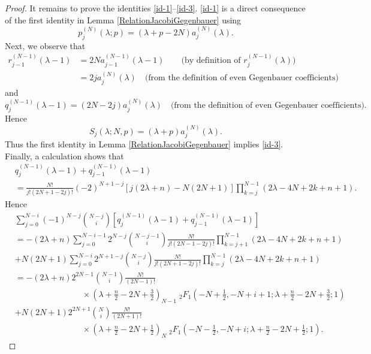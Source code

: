 \documentclass[a4paper,12pt,reqno]{amsart}
\numberwithin{theorem}{subsection}
\numberwithin{equation}{section}
\begin{document}
\begin{proof}
It remains to prove the identities \eqref{id-1}--\eqref{id-3}. \eqref{id-1} is
a direct consequence of the first identity in Lemma
\ref{RelationJacobiGegenbauer} using
$$
   p^{(N)}_j(\lambda;p) = (\lambda\!+\!p\!-\!2N) a_j^{(N)}(\lambda).
$$
Next, we observe that
\begin{align*}
   r_{j-1}^{(N-1)}(\lambda\!-\!1) & = 2N a_{j-1}^{(N-1)}(\lambda\!-\!1) \qquad
   \mbox{(by definition of $r_j^{(N-1)}(\lambda)$)} \\
   & = 2j a_j^{(N)}(\lambda) \quad \mbox{(from the definition of even Gegenbauer coefficients)}
\end{align*}
and
$$
   q_j^{(N-1)}(\lambda\!-\!1) = (2N\!-\!2j) a_j^{(N)}(\lambda)
   \quad \mbox{(from the definition of even Gegenbauer coefficients)}.
$$
Hence
$$
   S_j(\lambda;N,p) = (\lambda\!+\!p) a_j^{(N)}(\lambda).
$$
Thus the first identity in Lemma \ref{RelationJacobiGegenbauer} implies
\eqref{id-3}. Finally, a calculation shows that
\begin{align*}
   & q_{j}^{(N-1)}(\lambda\!-\!1) + q_{j-1}^{(N-1)}(\lambda\!-\!1) \\
   & = \frac{N!}{j!(2N\!+\!1\!-\!2j)!} (-2)^{N+1-j} \left[j(2\lambda\!+\!n) -
   N(2N\!+\!1)\right] \prod_{k=j}^{N-1} (2\lambda\!-\!4N\!+\!2k\!+\!n\!+\!1).
\end{align*}
Hence
\begin{align*}
   & \sum_{j=0}^{N-i} (-1)^{N-j} \binom{N-j}{i} \left[q_{j}^{(N-1)}(\lambda\!-\!1)
   + q_{j-1}^{(N-1)}(\lambda\!-\!1)\right] \\
   & = -(2\lambda\!+\!n) \sum_{j=0}^{N-i-1} 2^{N-j} \binom{N-j-1}{i}
   \frac{N!}{j!(2N\!-\!1\!-\!2j)!} \prod_{k=j+1}^{N-1} (2\lambda\!-\!4N\!+\!2k\!+\!n\!+\!1) \\
   & + N(2N\!+\!1) \sum_{j=0}^{N-i} 2^{N+1-j} \binom{N-j}{i} \frac{N!}{j!(2N\!+\!1\!-\!2j)!}
   \prod_{k=j}^{N-1} (2\lambda\!-\!4N\!+\!2k\!+\!n\!+\!1) \\
   & = -(2\lambda\!+\!n) 2^{2N-1} \binom{N-1}{i} \frac{N!}{(2N\!-\!1)!} \\
   & \qquad \qquad \qquad \qquad \times
   (\lambda\!+\!\tfrac{n}{2}\!-\!2N\!+\!\tfrac{3}{2})_{N-1} \;
   {}_2F_1(-N\!+\!\tfrac{1}{2},-N\!+\!i\!+\!1;\lambda\!+\!\tfrac{n}{2}\!-\!2N\!+\!\tfrac{3}{2};1) \\
   & + N(2N\!+\!1) 2^{2N+1} \binom{N}{i} \frac{N!}{(2N\!+\!1)!} \\
   & \qquad \qquad \qquad \qquad \times (\lambda\!+\!\tfrac{n}{2}\!-\!2N\!+\!\tfrac{1}{2})_N
   \; {}_2F_1(-N\!-\!\tfrac{1}{2},-N\!+\!i;\lambda\!+\!\tfrac{n}{2}\!-\!2N\!+\!\tfrac{1}{2};1).

\end{align*}
\end{proof}
\end{document}
